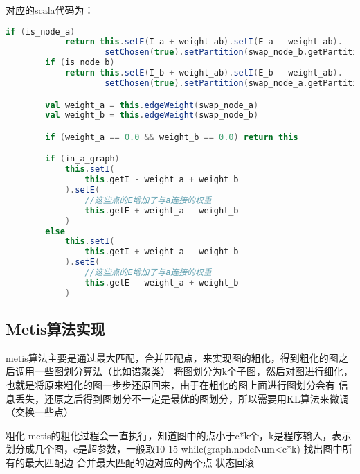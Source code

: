 
对应的scala代码为：

\begin{lstlisting}[language=Scala]
if (is_node_a)
            return this.setE(I_a + weight_ab).setI(E_a - weight_ab).
                    setChosen(true).setPartition(swap_node_b.getPartition)
        if (is_node_b)
            return this.setE(I_b + weight_ab).setI(E_b - weight_ab).
                    setChosen(true).setPartition(swap_node_a.getPartition)

        val weight_a = this.edgeWeight(swap_node_a)
        val weight_b = this.edgeWeight(swap_node_b)

        if (weight_a == 0.0 && weight_b == 0.0) return this

        if (in_a_graph)
            this.setI(
                this.getI - weight_a + weight_b
            ).setE(
                //这些点的E增加了与a连接的权重
                this.getE + weight_a - weight_b
            )
        else
            this.setI(
                this.getI + weight_a - weight_b
            ).setE(
                //这些点的E增加了与a连接的权重
                this.getE - weight_a + weight_b
            )

\end{lstlisting}

\subsection{Metis算法实现}

metis算法主要是通过最大匹配，合并匹配点，来实现图的粗化，得到粗化的图之后调用一些图划分算法（比如谱聚类）
将图划分为k个子图，然后对图进行细化，也就是将原来粗化的图一步步还原回来，由于在粗化的图上面进行图划分会有
信息丢失，还原之后得到图划分不一定是最优的图划分，所以需要用KL算法来微调（交换一些点）

粗化
metis的粗化过程会一直执行，知道图中的点小于c*k个，k是程序输入，表示划分成几个图，c是超参数，一般取10-15
while(graph.nodeNum<c*k)
   找出图中所有的最大匹配边
   合并最大匹配的边对应的两个点
   状态回滚

